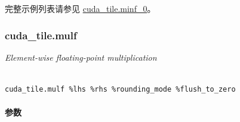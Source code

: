 \documentclass{article}
\begin{document}
完整示例列表请参见 \href{https://docs.nvidia.com/cuda/tile-ir/latest/sections/appendix.html#example-cuda-tile-minf-0}{cuda\_tile.minf\_0}。





\subsubsection{cuda\_tile.mulf}


\textit{Element-wise floating-point multiplication}




\begin{lstlisting}

cuda_tile.mulf %lhs %rhs %rounding_mode %flush_to_zero

\end{lstlisting}



\paragraph{参数}
\end{document}
